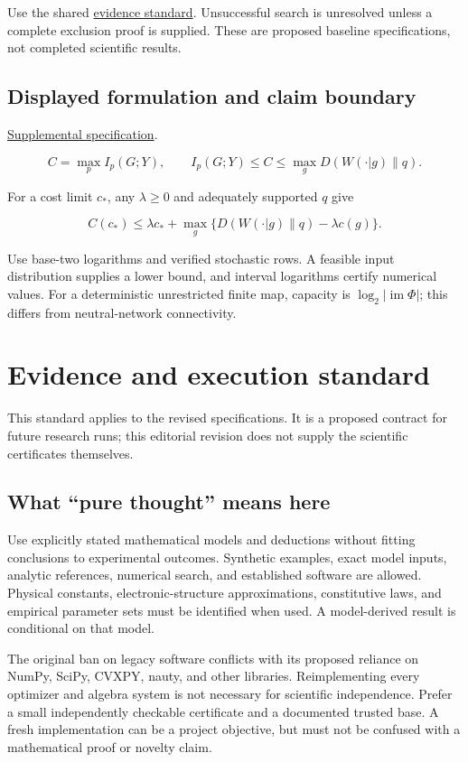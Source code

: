 \documentclass[
  11pt,
]{article}
\begin{document}
Use the shared
\href{https://github.com/rick-stevens-ai/Pure-Thought/blob/main/reviews/EVIDENCE-STANDARD.md}{evidence
standard}. Unsuccessful search is unresolved unless a complete exclusion
proof is supplied. These are proposed baseline specifications, not
completed scientific results.

\subsection{Displayed formulation and claim boundary}

\href{https://github.com/rick-stevens-ai/Pure-Thought/blob/main/supplemental/S12.md}{Supplemental
specification}.

\[C=\max_p I_p(G;Y),\qquad
I_p(G;Y)\le C\le\max_g D(W(\cdot|g)\|q).\]

For a cost limit \(c_*\), any \(\lambda\ge0\) and adequately supported
\(q\) give

\[C(c_*)\le\lambda c_*+
\max_g\{D(W(\cdot|g)\|q)-\lambda c(g)\}.\]

Use base-two logarithms and verified stochastic rows. A feasible input
distribution supplies a lower bound, and interval logarithms certify
numerical values. For a deterministic unrestricted finite map, capacity
is \(\log_2|\operatorname{im}\Phi|\); this differs from neutral-network
connectivity.

\section{Evidence and execution standard}

This standard applies to the revised specifications. It is a proposed
contract for future research runs; this editorial revision does not
supply the scientific certificates themselves.

\subsection{What ``pure thought'' means here}

Use explicitly stated mathematical models and deductions without fitting
conclusions to experimental outcomes. Synthetic examples, exact model
inputs, analytic references, numerical search, and established software
are allowed. Physical constants, electronic-structure approximations,
constitutive laws, and empirical parameter sets must be identified when
used. A model-derived result is conditional on that model.

The original ban on legacy software conflicts with its proposed reliance
on NumPy, SciPy, CVXPY, nauty, and other libraries. Reimplementing every
optimizer and algebra system is not necessary for scientific
independence. Prefer a small independently checkable certificate and a
documented trusted base. A fresh implementation can be a project
objective, but must not be confused with a mathematical proof or novelty
claim.
\end{document}
